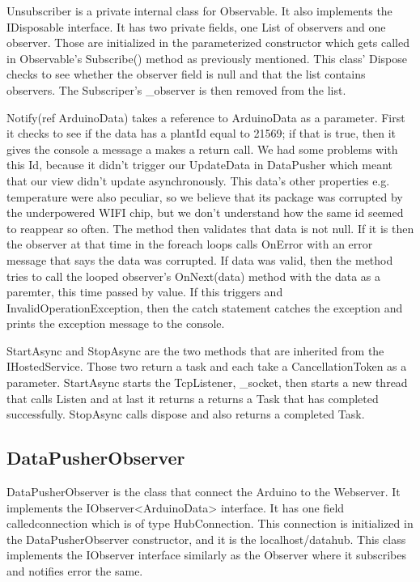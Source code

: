 \documentclass[a4paper,12pt,twoside,openright,titlepage]{book}
\begin{document}
Unsubscriber is a private internal class for Observable. It also implements the IDisposable interface.  It has two private fields, one List of observers and one observer. Those are initialized in the parameterized constructor which gets called in Observable's Subscribe() method as previously mentioned. This class' Dispose checks to see whether the observer field is null and that the list contains observers. The Subscriper's \_observer is then removed from the list.

Notify(ref ArduinoData) takes a reference to ArduinoData as a parameter. First it checks to see if the data has a plantId equal to 21569; if that is true, then it gives the console a message a makes a return call. We had some problems with this Id, because it didn't trigger our UpdateData in DataPusher which meant that our view didn't update asynchronously. This data's other properties e.g. temperature were also peculiar, so we believe that its package was corrupted by the underpowered WIFI chip, but we don't understand how the same id seemed to reappear so often. 
The method then validates that data is not null. If it is then the observer at that time in the foreach loops calls OnError with an error message that says the data was corrupted. If data was valid, then the method tries to call the looped observer's OnNext(data) method with the data as a paremter, this time passed by value. If this triggers and InvalidOperationException, then the catch statement catches the exception and prints the exception message to the console.

StartAsync and StopAsync are the two methods that are inherited from the IHostedService. Those two return a task and each take a CancellationToken as a parameter. StartAsync starts the TcpListener, \_socket, then starts a new thread that calls Listen and at last it returns a returns a Task that has completed successfully. StopAsync calls dispose and also returns a completed Task.


\subsection{DataPusherObserver}

DataPusherObserver is the class that connect the Arduino to the Webserver. It implements the IObserver<ArduinoData> interface. It has one field calledconnection which is of type HubConnection. This connection is initialized in the DataPusherObserver constructor, and it is the localhost/datahub. This class implements the IObserver interface similarly  as the Observer where it subscribes and notifies error the same.
\end{document}
